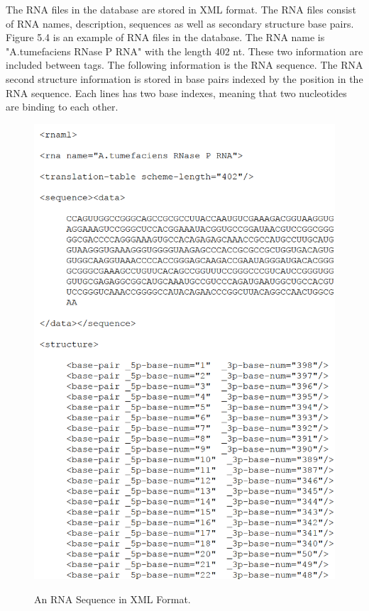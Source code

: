 The RNA files in the database are stored in XML format. The RNA files consist of RNA names, description, sequences as well as secondary structure base pairs.
Figure 5.4 is an example of RNA files in the database. The RNA name is "A.tumefaciens RNase P RNA" with the length 402 nt. These two information are included between tags. The following information is the RNA sequence. The RNA second structure information is stored in base pairs indexed by the position in the RNA sequence. Each lines has two base indexes, meaning that two nucleotides are binding to each other. 
\begin{figure}
		\centering
		\includegraphics[width=13cm,clip]{Figures/RNADatabase}
		\label{An RNA Sequence in XML Format.} 
		\caption{An RNA Sequence in XML Format.}
\end{figure}

